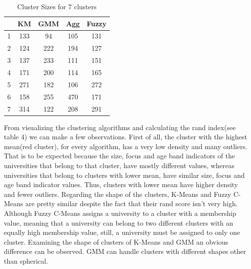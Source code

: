 \documentclass[conference]{IEEEtran}
\begin{document}
\begin{table}[ht]
    \begin{center}
        \caption{Cluster Sizes for 7 clusters}
        \renewcommand{\arraystretch}{1.25}
        \begin{tabular}{ |c|c|c|c|c| } 
            \hline
            & KM & GMM & Agg & Fuzzy \\
            \hline
            1 & 133 & 94 & 105 & 131\\
            \hline
            2 & 124 & 222 & 194 & 127\\ 
            \hline
            3 & 137 & 233 & 111 & 151\\ 
            \hline
            4 & 171 & 200 & 114 & 165\\
            \hline
            5 & 271 & 182 & 106 & 272\\
            \hline
            6 & 158 & 255 & 470 & 171\\
            \hline
            7 & 314 & 122 & 208 & 291\\
            \hline
        \end{tabular}
    \end{center}
\end{table}



From visualizing the clustering algorithms and calculating the rand index(see table 4) we can make a few observations. First of all, the cluster with the highest mean(red cluster), for every algorithm, has a very low density and many outliers. That is to be expected because the size, focus and age band indicators of the universities that belong to that cluster, have mostly different values, whereas universities that belong to clusters with lower mean, have similar size, focus and age band indicator values. Thus, clusters with lower mean have higher density and fewer outliers. Regarding the shape of the clusters, K-Means and Fuzzy C-Means are pretty similar despite the fact that their rand score isn't very high. Although Fuzzy C-Means assigns a university to a cluster with a membership value, meaning that a university can belong to two different clusters with an equally high membership value, still, a university must be assigned to only one cluster. Examining the shape of clusters of K-Means and GMM an obvious difference can be observed. GMM can handle clusters with different shapes other than spherical. \\
\end{document}
